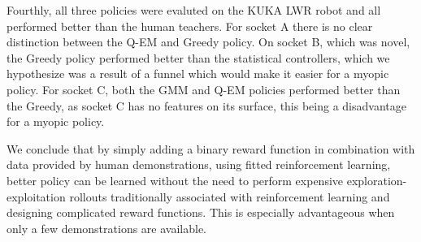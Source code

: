 Fourthly, all three policies were evaluted on the KUKA LWR robot and all performed better than the human 
teachers. For socket A there is no clear distinction between 
the Q-EM and Greedy policy. On socket B, which was novel, the Greedy policy performed better than the statistical controllers, 
which we hypothesize was a result of a funnel which would make it easier for a myopic policy. For socket C, both the 
GMM and Q-EM policies performed better than the Greedy, as socket C has no features on its surface, this being a disadvantage 
for a myopic policy.

We conclude that by simply adding a binary reward function in combination with 
data provided by human demonstrations, using fitted reinforcement learning, better policy can be learned without 
the need to perform expensive exploration-exploitation rollouts traditionally associated with reinforcement learning and 
designing complicated reward functions. This is especially advantageous when only a few demonstrations are available.
